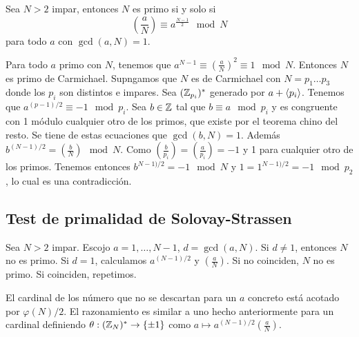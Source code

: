 \documentclass[CR.tex]{subfiles}
\begin{document}
\begin{prop}
Sea $N>2$ impar, entonces $N$ es primo si y solo si 
\[
\left(\frac{a}{N}\right)\equiv a^{\frac{N-1}{2}}\mod N
\]
para todo $a$ con $\gcd(a,N)=1$.
\end{prop}
\begin{dem}
Para todo $a$ primo con $N$, tenemos que $a^{N-1}\equiv (\frac{a}{N})^2\equiv 1\mod N$. Entonces $N$ es primo de Carmichael. Supngamos que $N$ es de Carmichael con $N=p_1\dots p_3$ donde los $p_i$ son distintos e impares. Sea $(\mathbb{Z}_{p_i})^*$ generado por $a+\langle{p_i}\rangle$. Tenemos que $a^{(p-1)/2}\equiv -1\mod p_i$. Sea $b\in\mathbb{Z}$ tal que $b\equiv a\mod p_i$ y es congruente con 1 módulo cualquier otro de los primos, que existe por el teorema chino del resto. Se tiene de estas ecuaciones que $\gcd(b,N)=1$. Además $b^{(N-1)/2}=(\frac{b}{N})\mod N$. Como $(\frac{b}{p_i})=(\frac{a}{p_i})=-1$ y 1 para cualquier otro de los primos. Tenemos entonces  $b^{N-1)/2}=-1\mod N$ y $1=1^{N-1)/2}=-1\mod p_2$, lo cual es una contradicción.
\end{dem}

\subsection{Test de primalidad de Solovay-Strassen}
Sea $N>2$ impar. Escojo $a=1,\dots, N-1$, $d=\gcd(a,N)$. Si $d\neq 1$, entonces $N$ no es primo. Si $d=1$, calculamos $a^{(N-1)/2}$ y $(\frac{a}{N})$. Si no coinciden, $N$ no es primo. Si coinciden, repetimos.

El cardinal de los número que no se descartan para un $a$ concreto está acotado por $\varphi(N)/2$. El razonamiento es similar a uno hecho anteriormente para un cardinal definiendo $\theta:(\mathbb{Z}_N)^*\to\{\pm 1\}$ como $a\mapsto a^{(N-1)/2}(\frac{a}{N})$. 
\end{document}

